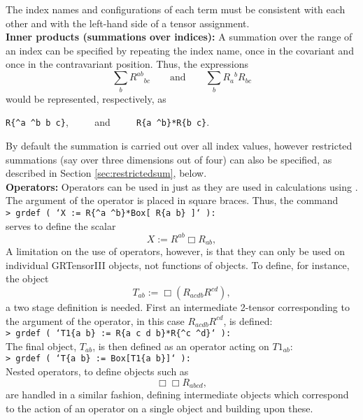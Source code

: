 \documentclass{article}
\begin{document}
The index names and configurations of each term must be 
consistent with each other and with the left-hand side of a tensor
assignment.\\

\noindent\textbf{Inner products (summations over indices):} A summation
over the range of an index can be specified by repeating the index
name, once in the covariant and once in the contravariant position.
Thus, the expressions
\[
  \sum_b R^{ab}{}_{bc} \qquad\text{and}\qquad \sum_b R_a{}^b R_{bc}
\]
would be represented, respectively, as

\begin{center}
  \texttt{R\{\^{}a \^{}b b c\}}, $\qquad$ and $\qquad$ 
  \texttt{R\{a \^{}b\}*R\{b c\}}.
\end{center}

By default the summation is carried out over all index values, however
restricted summations (say over three dimensions out of four) can also
be specified, as described in Section \ref{sec:restrictedsum},
below.\\

\noindent\textbf{Operators:} Operators can be used in 
just as they are used in calculations using . The
argument of the operator is placed in square braces. Thus, the
command\\

\noindent\texttt{> grdef ( `X := R\{\^{}a \^{}b\}*Box[ R\{a b\} ]` ):}\\

\noindent serves to define the scalar
\[
  X := R^{ab}\Box R_{ab},
\]
A limitation on the use of operators, however, is that they can only
be used on individual GRTensorIII objects, not functions of objects.
To define, for instance, the object
\[
  T_{ab} := \Box (R_{acdb}R^{cd}),
\]
a two stage definition is needed. First an intermediate 2-tensor 
corresponding to the argument of the operator,
in this case $R_{acdb}R^{cd}$, is defined:\\

\noindent\texttt{> grdef ( `T1\{a b\} := R\{a c d b\}*R\{\^{}c \^{}d\}` ):}\\

\noindent The final object, $T_{ab}$, is then defined as an operator acting on
$T1_{ab}$:\\

\noindent\texttt{> grdef ( `T\{a b\} := Box[T1\{a b\}]` ):}\\

Nested operators, to define objects such as
\[
  \Box\Box R_{abcd},
\]
are handled in a similar fashion, defining intermediate
objects which correspond to the action of an operator on a single
object and building upon these.
\end{document}
